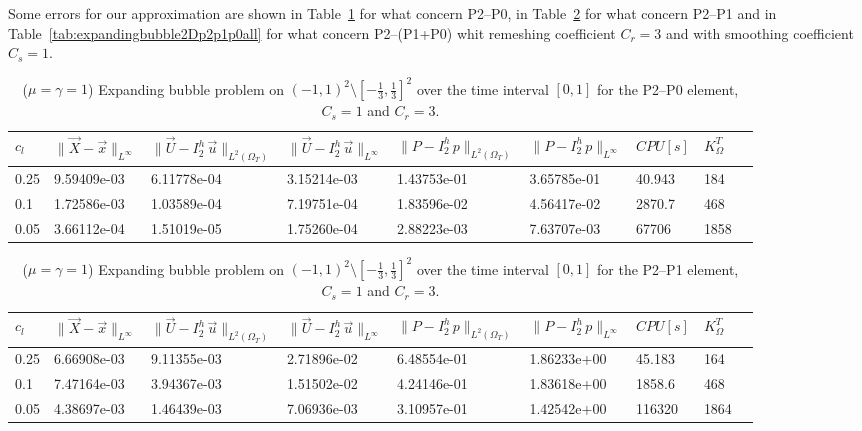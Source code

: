 \documentclass[a4paper,12pt,onecolumn]{article}
\newcommand{\errorXx}{\|\vec{X} - \vec{x}\|_{L^\infty}}
\newcommand{\LerrorUu}[1]{\|\vec U - I^h_{#1}\,\vec u\|_{L^2(\Omega_T)}}
\newcommand{\errorUu}[1]{\|\vec U - I^h_{#1}\,\vec u\|_{L^\infty}}
\newcommand{\errorPp}[1]{\|P - I^h_{#1}\,p\|_{L^\infty}}
\newcommand{\LerrorPp}[1]{\|P - I^h_{#1}\,p\|_{L^2(\Omega_T)}}
\begin{document}
Some errors for our approximation are shown in Table~\ref{tab:expandingbubble2Dp2p0all} for what concern P2--P0, in Table~\ref{tab:expandingbubble2Dp2p1all} for what concern P2--P1 and in Table~\ref{tab:expandingbubble2Dp2p1p0all} for what concern P2--(P1+P0) whit remeshing coefficient $C_r=3$ and with smoothing coefficient $C_s=1$.

\begin{table}
 \center
 \hspace*{-2cm}
\begin{tabular}{lllllllll}
\hline
$c_l$ & $\errorXx$ & $\LerrorUu2$ & $\errorUu2$ & $\LerrorPp2$ & $\errorPp2$ & $CPU[s]$ & $K_\Omega^T$\\
\hline
0.25 & 9.59409e-03 & 6.11778e-04 & 3.15214e-03 & 1.43753e-01 & 3.65785e-01 & 40.943 & 184\\
0.1 & 1.72586e-03 & 1.03589e-04 & 7.19751e-04 & 1.83596e-02 & 4.56417e-02 & 2870.7 & 468\\
0.05 & 3.66112e-04 & 1.51019e-05 & 1.75260e-04 & 2.88223e-03 & 7.63707e-03 & 67706 & 1858\\
\hline
\end{tabular}
\hspace*{-2cm}
\caption{($\mu=\gamma=1$) Expanding bubble problem on $(-1,1)^2\setminus[-\frac{1}{3},\frac{1}{3}]^2$ over the time interval $[0,1]$ for the P2--P0 element, $C_s=1$ and $C_r=3$.}
\label{tab:expandingbubble2Dp2p0all}
\end{table}

\begin{table}
 \center
 \hspace*{-2cm}
\begin{tabular}{lllllllll}
\hline
$c_l$ & $\errorXx$ & $\LerrorUu2$ & $\errorUu2$ & $\LerrorPp2$ & $\errorPp2$ & $CPU[s]$ & $K_\Omega^T$\\
\hline
0.25 & 6.66908e-03 & 9.11355e-03 & 2.71896e-02 & 6.48554e-01 & 1.86233e+00 & 45.183 & 164\\
0.1 & 7.47164e-03 & 3.94367e-03 & 1.51502e-02 & 4.24146e-01 & 1.83618e+00 & 1858.6 & 468\\
0.05 & 4.38697e-03 & 1.46439e-03 & 7.06936e-03 & 3.10957e-01 & 1.42542e+00 & 116320 & 1864\\
\hline
\end{tabular}
\hspace*{-2cm}
\caption{($\mu=\gamma=1$) Expanding bubble problem on $(-1,1)^2\setminus[-\frac{1}{3},\frac{1}{3}]^2$ over the time interval $[0,1]$ for the P2--P1 element, $C_s=1$ and $C_r=3$.}
\label{tab:expandingbubble2Dp2p1all}
\end{table}
\end{document}
